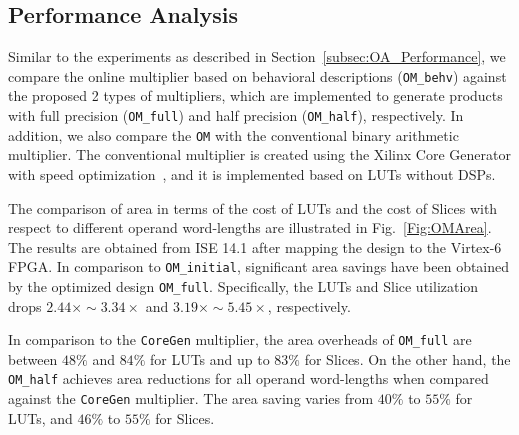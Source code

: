\documentclass[conference]{IEEEtran}
\begin{document}
\subsection{Performance Analysis}
Similar to the experiments as described in Section~\ref{subsec:OA_Performance}, we compare the online multiplier based on behavioral descriptions (\texttt{OM\_behv}) against the proposed 2 types of multipliers, which are implemented to generate products with full precision (\texttt{OM\_full}) and half precision (\texttt{OM\_half}), respectively. In addition, we also compare the \texttt{OM} with the conventional binary arithmetic multiplier. The conventional multiplier is created using the Xilinx Core Generator with speed optimization~\cite{XilinxMult}, and it is implemented based on LUTs without DSPs.

The comparison of area in terms of the cost of LUTs and the cost of Slices with respect to different operand word-lengths are illustrated in Fig.~\ref{Fig:OMArea}. The results are obtained from ISE 14.1 after mapping the design to the Virtex-6 FPGA. In comparison to \texttt{OM\_initial}, significant area savings have been obtained by the optimized design \texttt{OM\_full}. Specifically, the LUTs and Slice utilization drops $2.44\times\sim3.34\times$ and $3.19\times\sim5.45\times$, respectively.

In comparison to the \texttt{CoreGen} multiplier, the area overheads of \texttt{OM\_full} are between $48\%$ and $84\%$ for LUTs and up to $83\%$ for Slices. On the other hand, the \texttt{OM\_half} achieves area reductions for all operand word-lengths when compared against the \texttt{CoreGen} multiplier. The area saving varies from $40\%$ to $55\%$ for LUTs, and $46\%$ to $55\%$ for Slices.
\end{document}
